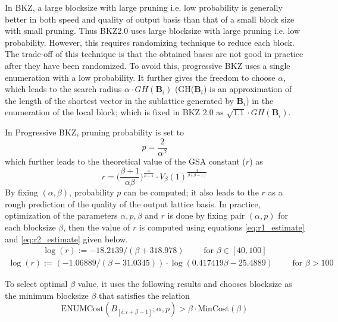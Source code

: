 In BKZ, a large blocksize with large pruning i.e.
low probability is generally better in both speed and quality of output basis than that of a small block size with small pruning.
Thus BKZ2.0 uses large blocksize with large pruning i.e.
low probability.
However, this requires randomizing technique to reduce each block.
The trade-off of this technique is that the obtained bases are not good in practice after they have been randomized.
To avoid this, progressive BKZ uses a single enumeration with a low probability.
It further gives the freedom to choose $\alpha$, which leads to the search radius $\alpha \cdot GH(\pmb{B}_i)$ (GH($\pmb{B}_i$) is an approximation of the length of the shortest vector in the sublattice generated by $\pmb{B}_i$) in the enumeration of the local block; which is fixed in BKZ 2.0 as $\sqrt{1.1} \cdot GH(\pmb{B}_i)$.

In Progressive BKZ, pruning probability is set to
\begin{equation}
    p=\frac{2}{\alpha^{\beta}}
\end{equation}
which further leads to the theoretical value of the GSA constant ($r$) as
\begin{equation}
    r=\Big(\frac{\beta+1}{\alpha \beta}\Big)^{\frac{4}{\beta-1}} \cdot V_{\beta}(1)^{\frac{4}{\beta(\beta-1)}}
    \label{eq:computing_r}
\end{equation}
By fixing $(\alpha,\beta)$, probability $p$ can be computed; it also leads to the $r$ as a rough prediction of the quality of the output lattice basis.
In practice, optimization of the parameters $\alpha,p,\beta$ and $r$ is done by fixing pair $(\alpha,p)$ for each blocksize $\beta$, then the value of $r$ is computed using equations \ref{eq:r1_estimate} and \ref{eq:r2_estimate} given below.
\begin{align}
    \log{(r)} := -18.2139/(\beta + 318.978) \hspace{2em}\text{ for }\beta\in[40,100]
    \label{eq:r1_estimate}
\end{align}
\begin{align}
    \log{(r)} := (-1.06889/(\beta - 31.0345)) \cdot \log(0.417419\beta - 25.4889)
    \hspace{2em}\text{ for }\beta >100
    \label{eq:r2_estimate}
\end{align}

To select optimal $\beta$ value, it uses the following results and chooses blocksize as the minimum blocksize $\beta$ that satisfies the relation
\begin{equation*}
    \text{ENUMCost}(B_{[i:i+\beta-1]};\alpha,p) > \beta \cdot \text{MinCost}(\beta)
\end{equation*}

